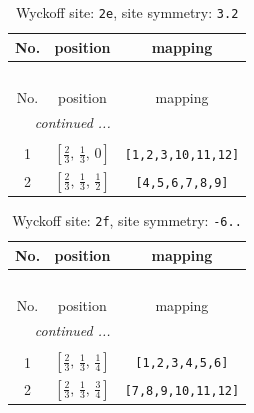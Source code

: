 \documentclass[fleqn,8pt]{jsarticle}
\begin{document}
\begin{longtable}{ccc}
\caption{Wyckoff site: {\tt 2e}, site symmetry: {\tt 3.2}}
 \\
 \hline \hline
No. & position & mapping \\ \hline \endfirsthead

\multicolumn{2}{l}{\tablename\ \thetable{}} \\
 \hline \hline
No. & position & mapping \\ \hline \endhead

 \hline \hline
\multicolumn{2}{r}{\footnotesize\it continued ...} \\ \endfoot

 \hline \hline
\multicolumn{2}{r}{} \\ \endlastfoot

1 & $\left[ \frac{2}{3},\, \frac{1}{3},\, 0 \right]$ & {\tt [1,2,3,10,11,12]} \\ \hline
2 & $\left[ \frac{2}{3},\, \frac{1}{3},\, \frac{1}{2} \right]$ & {\tt [4,5,6,7,8,9]} \\
\end{longtable}
\renewcommand{\arraystretch}{1.2}
\begin{longtable}{ccc}
\caption{Wyckoff site: {\tt 2f}, site symmetry: {\tt -6..}}
 \\
 \hline \hline
No. & position & mapping \\ \hline \endfirsthead

\multicolumn{2}{l}{\tablename\ \thetable{}} \\
 \hline \hline
No. & position & mapping \\ \hline \endhead

 \hline \hline
\multicolumn{2}{r}{\footnotesize\it continued ...} \\ \endfoot

 \hline \hline
\multicolumn{2}{r}{} \\ \endlastfoot

1 & $\left[ \frac{2}{3},\, \frac{1}{3},\, \frac{1}{4} \right]$ & {\tt [1,2,3,4,5,6]} \\ \hline
2 & $\left[ \frac{2}{3},\, \frac{1}{3},\, \frac{3}{4} \right]$ & {\tt [7,8,9,10,11,12]} \\
\end{longtable}
\renewcommand{\arraystretch}{1.2}
\end{document}
